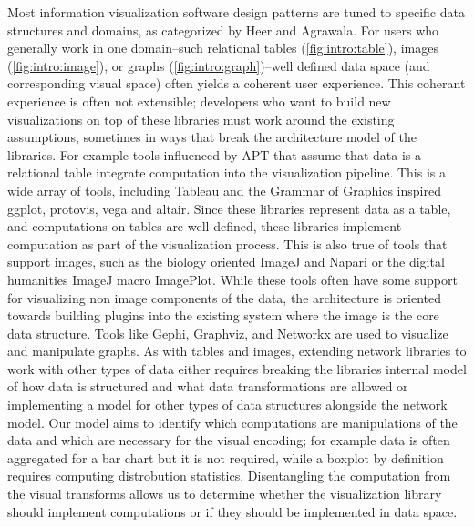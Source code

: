 \documentclass[../main.tex]{subfiles}
\begin{document}
Most information visualization software design patterns are tuned to specific data structures and domains, as categorized by Heer and Agrawala\cite{HeerSoftware2006}. For users who generally work in one domain--such relational tables (\autoref{fig:intro:table}), images (\autoref{fig:intro:image}), or graphs (\autoref{fig:intro:graph})--well defined data space (and corresponding visual space\cite{chiTaxonomyVisualizationTechniques2000}) often yields a coherent user experience\cite{heerDeclarative2010}. This coherant experience is often not extensible; developers who want to build new visualizations on top of these libraries must work around the existing assumptions, sometimes in ways that break the architecture model of the libraries. For example tools influenced by APT that assume that data is a relational table integrate computation into the visualization pipeline. This is a wide array of tools, including Tableau\cite{StoltePolaris2002,hanrahanVizQL2006,MackinlayShowme2007} and the Grammar of Graphics\cite{wilkinsonGrammarGraphics2005} inspired ggplot\cite{wickhamGgplot2ElegantGraphics2016a}, protovis\cite{bostockProtoviz2009}, vega\cite{satyanarayanDeclarativeInteractionDesign2014} and altair\cite{vanderplasAltairInteractiveStatistical2018}. Since these libraries represent data as a table, and computations on tables are well defined\cite{ullmanFirstCourseDatabase2008}, these libraries implement computation as part of the visualization process. This is also true of tools that support images, such as the biology oriented ImageJ\cite{schneiderNIHImageImageJ2012} and  Napari\cite{nicholas_sofroniew_2021_4533308} or the digital humanities ImageJ macro ImagePlot\cite{studiesCulturevisImageplot2021}. While these tools often have some support for visualizing non image components of the data, the architecture is oriented towards building plugins into the existing system \cite{WritingPlugins} where the image is the core data structure. Tools like Gephi\cite{bastianGephiOpenSource2009}, Graphviz\cite{ellsonGraphvizOpenSource2002}, and Networkx\cite{HagbergExploringNetwork2008} are used to  visualize and manipulate graphs. As with tables and images, extending network libraries to work with other types of data either requires breaking the libraries internal model of how data is structured and what data transformations are allowed or implementing a model for other types of data structures alongside the network model. Our model aims to identify which computations are manipulations of the data and which are necessary for the visual encoding; for example data is often aggregated for a bar chart but it is not required, while a boxplot by definition requires computing distrobution statistics\cite{wickham40YearsBoxplots2011}. Disentangling the computation from the visual transforms allows us to determine whether the visualization library should implement computations or if they should be implemented in data space. 
\end{document}
